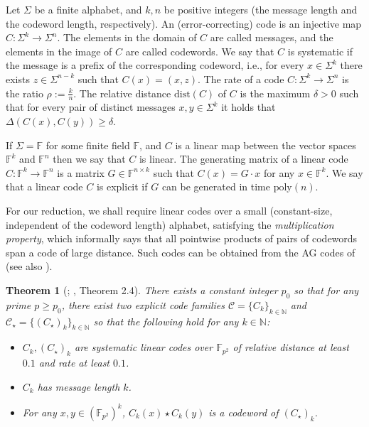 \documentclass[11pt]{article}
\theoremstyle{plain}
\newtheorem{thm}{Theorem}[section]
\theoremstyle{remark}
\newcommand{\N}{\mathbb{N}}
\newcommand{\calC}{\mathcal{C}}
\newcommand{\F}{\mathbb{F}}
\newcommand{\dist}{\mathrm{dist}}
\newcommand{\poly}{\mathrm{poly}}
\begin{document}
Let $\Sigma$ be a finite alphabet, and $k, n$ be positive integers (the \textsf{message length} and the
\textsf{codeword length}, respectively). An \textsf{(error-correcting) code} is an injective map $C: \Sigma^k \to \Sigma^n$. The elements in the domain of $C$ are called \textsf{messages}, and the elements in the image of $C$ are called \textsf{codewords}.
We say that $C$ is \textsf{systematic} if the message is a prefix of
the corresponding codeword, i.e., for every $x \in \Sigma^k$ there
exists $z \in \Sigma^{n-k}$ such that $C(x) = (x,z)$.
The \textsf{rate} of a code $C: \Sigma^k \to \Sigma^n$ is the ratio
$\rho := \frac{k} {n}$.  The \textsf{relative distance} $\dist(C)$ of
$C$ is the maximum $\delta >0$ such that for every pair of distinct
messages $x,y\in \Sigma^k$ it holds that $\Delta(C(x),C(y))\ge\delta$.

If $\Sigma=\F$ for some finite field $\F$, and $C$ is a linear map
between the vector spaces $\F^k$ and $\F^n$ then we say that $C$ is
\textsf{linear}. The \textsf{generating matrix} of a linear code
$C: \F^k \to \F^n$ is a matrix $G \in \F^{n \times k}$ such that
$C(x) = G\cdot x$ for any $x\in \F^k$. We say that a linear code $C$ is \textsf{explicit} if 
$G$ can be generated in time $\poly(n)$. 

For our reduction, we shall require linear codes over a small (constant-size, independent of the codeword length) alphabet, satisfying the \emph{multiplication property}, which informally says that all pointwise products of pairs of codewords span a code of large distance. 
Such codes can be obtained from the AG codes of \cite{SAKSD01} (see also \cite[Theorem 2.4]{Rub18}).

\begin{thm}[\cite{SAKSD01}; \cite{Rub18}, Theorem 2.4]\label{thm:ag}
There exists a constant integer $p_0$ so that for any prime $p \geq p_0$, there exist two explicit code families $\calC=\{C_k\}_{k \in \N}$ and $\calC_{\star}= \{(C_{\star})_k\}_{k \in \N}$ so that the following hold for any $k \in \N$:
\begin{itemize}
\item $C_k, (C_\star)_k$ are  systematic linear codes over $\F_{p^2}$ of  relative distance at least $0.1$ and rate at least $0.1$.
\item $C_k$ has message length $k$.
\item For any $x,y\in (\F_{p^2})^k$, $C_k(x) \star  C_k(y)$ is a codeword of $(C_\star)_k$. 
\end{itemize}
\end{thm}
\end{document}
